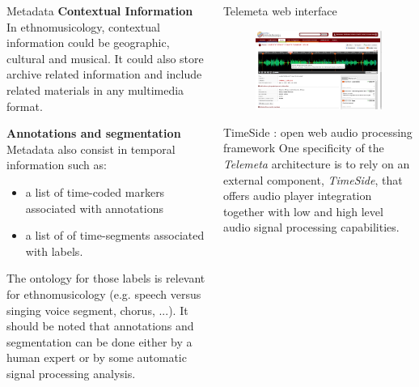 \documentclass[final, hyperref, table]{beamer}
\begin{document}
\begin{frame}[containsverbatim]{}
\begin{columns}[t]
\begin{column}[T]{.33\linewidth}
\begin{block}{Metadata}
\textbf{Contextual Information}\\
In ethnomusicology, contextual information could be geographic, cultural and musical. It could also store archive related information and include related materials in any multimedia format. 

\textbf{Annotations and segmentation}\\
Metadata also consist in temporal information such as:
\begin{itemize}
\item a list of \alert{time-coded markers} associated with annotations
\item a list of of \alert{time-segments} associated with labels.
\end{itemize}
The ontology for those labels is relevant for ethnomusicology (e.g. speech versus singing voice segment, chorus, ...).
It should be noted that annotations and segmentation can be done either by a human expert or by some automatic signal processing analysis.
\end{block}
\end{column}
   
\begin{column}[T]{.33\linewidth}
  \begin{block}{Telemeta web interface}
    \begin{figure}[htbp]
      \centering
      \includegraphics[width=0.32\paperwidth]{img/player_mark.png}
    \end{figure}
  \end{block}
  \begin{block}{TimeSide : open web audio processing framework}
One specificity of the \emph{Telemeta} architecture is to rely on an external component, \emph{TimeSide}, that offers audio player integration together with low and high level audio signal processing capabilities.


\end{block}
\end{column}
\end{columns}
\end{frame}
\end{document}
